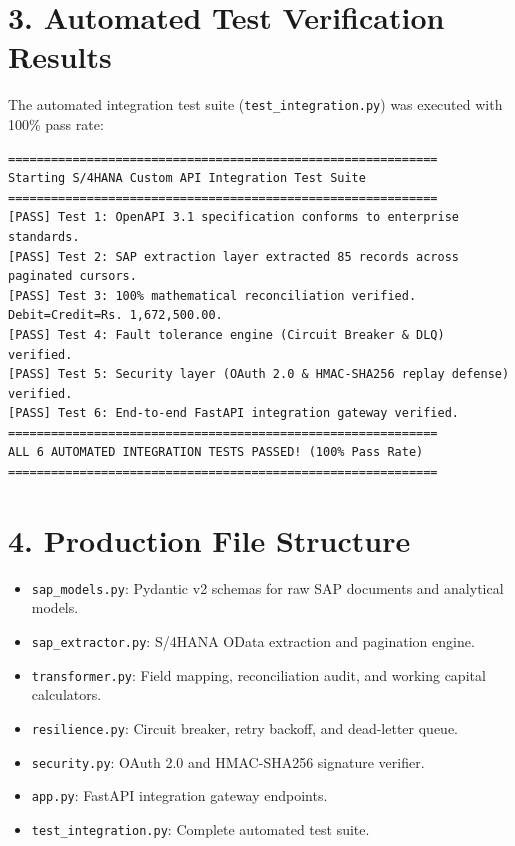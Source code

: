 \documentclass[11pt,a4paper]{article}
\begin{document}
\section{3. Automated Test Verification Results}
The automated integration test suite (\texttt{test\_integration.py}) was executed with 100\% pass rate:
\begin{lstlisting}
============================================================
Starting S/4HANA Custom API Integration Test Suite
============================================================
[PASS] Test 1: OpenAPI 3.1 specification conforms to enterprise standards.
[PASS] Test 2: SAP extraction layer extracted 85 records across paginated cursors.
[PASS] Test 3: 100% mathematical reconciliation verified. Debit=Credit=Rs. 1,672,500.00.
[PASS] Test 4: Fault tolerance engine (Circuit Breaker & DLQ) verified.
[PASS] Test 5: Security layer (OAuth 2.0 & HMAC-SHA256 replay defense) verified.
[PASS] Test 6: End-to-end FastAPI integration gateway verified.
============================================================
ALL 6 AUTOMATED INTEGRATION TESTS PASSED! (100% Pass Rate)
============================================================
\end{lstlisting}

\section{4. Production File Structure}
\begin{itemize}[leftmargin=1.5em, itemsep=2pt]
    \item \texttt{sap\_models.py}: Pydantic v2 schemas for raw SAP documents and analytical models.
    \item \texttt{sap\_extractor.py}: S/4HANA OData extraction and pagination engine.
    \item \texttt{transformer.py}: Field mapping, reconciliation audit, and working capital calculators.
    \item \texttt{resilience.py}: Circuit breaker, retry backoff, and dead-letter queue.
    \item \texttt{security.py}: OAuth 2.0 and HMAC-SHA256 signature verifier.
    \item \texttt{app.py}: FastAPI integration gateway endpoints.
    \item \texttt{test\_integration.py}: Complete automated test suite.
\end{itemize}
\end{document}
